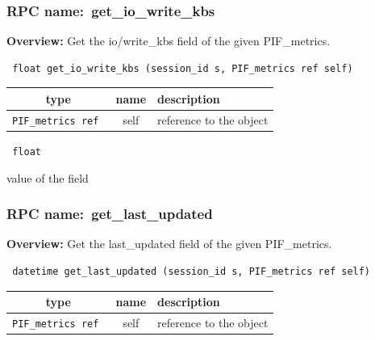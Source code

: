 \subsubsection{RPC name:~get\_io\_write\_kbs}

{\bf Overview:} 
Get the io/write\_kbs field of the given PIF\_metrics.

\begin{verbatim} float get_io_write_kbs (session_id s, PIF_metrics ref self)\end{verbatim}



 
\vspace{0.3cm}
\begin{tabular}{|c|c|p{7cm}|}
 \hline
{\bf type} & {\bf name} & {\bf description} \\ \hline
{\tt PIF\_metrics ref } & self & reference to the object \\ \hline 

\end{tabular}

\vspace{0.3cm}

{\tt 
float
}


value of the field
\vspace{0.3cm}
\vspace{0.3cm}
\vspace{0.3cm}
\subsubsection{RPC name:~get\_last\_updated}

{\bf Overview:} 
Get the last\_updated field of the given PIF\_metrics.

\begin{verbatim} datetime get_last_updated (session_id s, PIF_metrics ref self)\end{verbatim}



 
\vspace{0.3cm}
\begin{tabular}{|c|c|p{7cm}|}
 \hline
{\bf type} & {\bf name} & {\bf description} \\ \hline
{\tt PIF\_metrics ref } & self & reference to the object \\ \hline 

\end{tabular}


